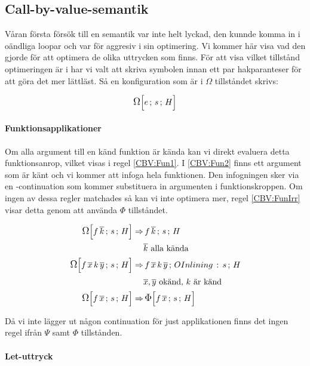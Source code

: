\documentclass[../Optimise]{subfiles}
\begin{document}

\subsection{Call-by-value-semantik}
\label{sec:Optimise:CBV}
Våran första försök till en semantik var inte helt lyckad, den kunnde komma in i
oändliga loopar och var för aggresiv i sin optimering. Vi kommer här visa vad den
gjorde för att optimera de olika uttrycken som finns. För att visa vilket tillstånd
optimeringen är i har vi valt att skriva symbolen innan ett par hakparanteser för
att göra det mer lättläst. Så en konfiguration som är i $\Omega$ tillståndet skrivs:

\[
\OMEGA sHe
\]


\paragraph{Funktionsapplikationer}
Om alla argument till en känd funktion är kända kan vi direkt evaluera detta funktionsanrop,
vilket visas i regel \eqref{CBV:Fun1}. I \eqref{CBV:Fun2} finns ett argument som
är känt och vi kommer att infoga hela funktionen. Den infogningen sker via en -continuation
som kommer substituera in argumenten i funktionskroppen. Om ingen av dessa regler
matchades så kan vi inte optimera mer, regel \eqref{CBV:FunIrr} visar detta genom
att använda $\Phi$ tillståndet.

\begin{align}
\label{CBV:Fun1} \OMEGA sH{f\,\many{k}}  \Rightarrow &\, \mc{f\,\many{k}}sH\\
 & \many{k} \text{ alla kända} \nonumber \\
\label{CBV:Fun2} \OMEGA sH{f\,\many{x}\, k\,\many{y}}  \Rightarrow &\, \mc{f\,\many{x}\, k\,\many{y}}{\oInline s}H\\
 & \many{x},\many{y} \text{ okänd, } k \text{ är känd} \nonumber \\
\label{CBV:FunIrr} \OMEGA sH{f\,\many{x}} \Rightarrow &\, \IRR sH{f\,\many{x}}
\end{align}

Då vi inte lägger ut någon continuation för just applikationen finns det ingen regel
ifrån $\Psi$ samt $\Phi$ tillstånden.



\paragraph{Let-uttryck}
\end{document}

